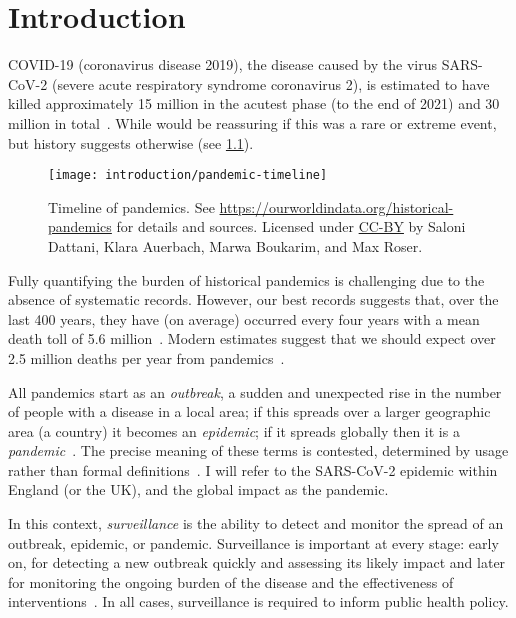 \documentclass[thesis.tex]{subfiles}
\begin{document}
\chapter{Introduction} \label{intro}

COVID-19 (coronavirus disease 2019), the disease caused by the virus SARS-CoV-2 (severe acute respiratory syndrome coronavirus 2), is estimated to have killed approximately 15 million in the acutest phase (to the end of 2021) and 30 million in total~\autocite{whoCOVIDExcess,economistCOVIDExcess}.
While would be reassuring if this was a rare or extreme event, but history suggests otherwise (see \cref{intro:fig:pandemic-timeline}).
\begin{figure}
    \texttt{[image: introduction/pandemic-timeline]}
    \caption[Timeline of pandemics.]{%
        Timeline of pandemics.
        See \url{https://ourworldindata.org/historical-pandemics} for details and sources.
        Licensed under \href{https://creativecommons.org/licenses/by/4.0/}{CC-BY} by Saloni Dattani, Klara Auerbach, Marwa Boukarim, and Max Roser.
    }
    \label{intro:fig:pandemic-timeline}
\end{figure}

Fully quantifying the burden of historical pandemics is challenging due to the absence of systematic records.
However, our best records suggests that, over the last 400 years, they have (on average) occurred every four years with a mean death toll of 5.6 million~\autocite{maraniNovelEpidemics}.
Modern estimates suggest that we should expect over 2.5 million deaths per year from pandemics~\autocite{madhavPandemicMortality}.

All pandemics start as an \emph{outbreak}, a sudden and unexpected rise in the number of people with a disease in a local area; if this spreads over a larger geographic area (\eg a country) it becomes an \emph{epidemic}; if it spreads globally then it is a \emph{pandemic}~\autocite{grennanPandemic}.
The precise meaning of these terms is contested, determined by usage rather than formal definitions~\autocite{morensPandemic,doshiElusive}.
I will refer to the SARS-CoV-2 epidemic within England (or the UK), and the global impact as the pandemic.

In this context, \emph{surveillance} is the ability to detect and monitor the spread of an outbreak, epidemic, or pandemic.
Surveillance is important at every stage: early on, for detecting a new outbreak quickly and assessing its likely impact and later for monitoring the ongoing burden of the disease and the effectiveness of interventions~\autocite{whoFluSurveillance}.
In all cases, surveillance is required to inform public health policy.
\end{document}

